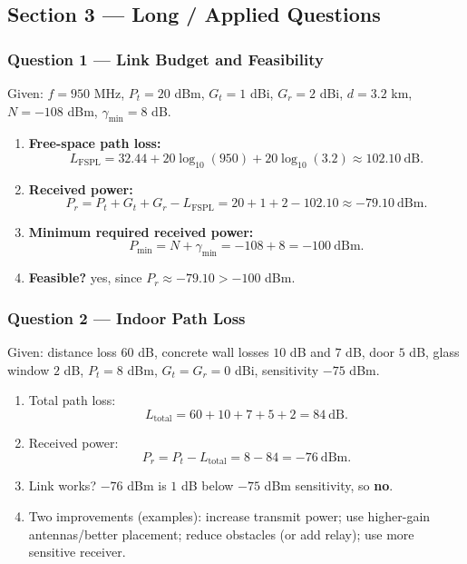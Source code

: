 \documentclass[11pt,a4paper]{article}
\begin{document}
\subsection*{Section 3 --- Long / Applied Questions}

\subsubsection*{Question 1 --- Link Budget and Feasibility}
Given: $f=950$ MHz, $P_t=20$ dBm, $G_t=1$ dBi, $G_r=2$ dBi, $d=3.2$ km, $N=-108$ dBm, $\gamma_{\min}=8$ dB.

\begin{enumerate}[label=\alph*.]
    \item \textbf{Free-space path loss:}
    \[
    L_{\mathrm{FSPL}}=32.44+20\log_{10}(950)+20\log_{10}(3.2)\approx 102.10\ \mathrm{dB}.
    \]
    \item \textbf{Received power:}
    \[
    P_r=P_t+G_t+G_r-L_{\mathrm{FSPL}}=20+1+2-102.10\approx -79.10\ \mathrm{dBm}.
    \]
    \item \textbf{Minimum required received power:}
    \[
    P_{\min}=N+\gamma_{\min}=-108+8=-100\ \mathrm{dBm}.
    \]
    \item \textbf{Feasible?} yes, since $P_r\approx -79.10 > -100$ dBm.
\end{enumerate}

\subsubsection*{Question 2 --- Indoor Path Loss}
Given: distance loss $60$ dB, concrete wall losses $10$ dB and $7$ dB, door $5$ dB, glass window $2$ dB, $P_t=8$ dBm, $G_t=G_r=0$ dBi, sensitivity $-75$ dBm.

\begin{enumerate}[label=\alph*.]
    \item Total path loss:
    \[
    L_{\text{total}}=60+10+7+5+2=84\ \mathrm{dB}.
    \]
    \item Received power:
    \[
    P_r=P_t-L_{\text{total}}=8-84=-76\ \mathrm{dBm}.
    \]
    \item Link works? $-76$ dBm is $1$ dB below $-75$ dBm sensitivity, so \textbf{no}.
    \item Two improvements (examples): increase transmit power; use higher-gain antennas/better placement; reduce obstacles (or add relay); use more sensitive receiver.
\end{enumerate}
\end{document}
